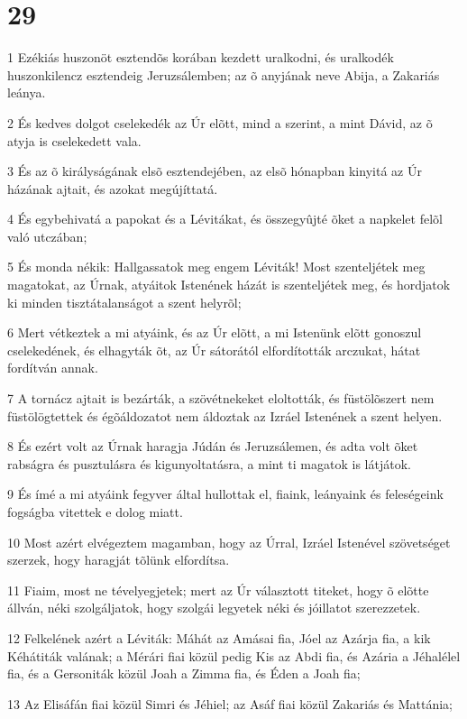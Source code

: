 \chapter{29}

\par 1 Ezékiás huszonöt esztendõs korában kezdett uralkodni, és uralkodék huszonkilencz esztendeig Jeruzsálemben; az õ anyjának neve Abija, a Zakariás leánya.
\par 2 És kedves dolgot cselekedék az Úr elõtt, mind a szerint, a mint Dávid, az õ atyja is cselekedett vala.
\par 3 És az õ királyságának elsõ esztendejében, az elsõ hónapban kinyitá az Úr házának ajtait, és azokat megújíttatá.
\par 4 És egybehivatá a papokat és a Lévitákat, és összegyûjté õket a napkelet felõl való utczában;
\par 5 És monda nékik: Hallgassatok meg engem Léviták! Most szenteljétek meg magatokat, az Úrnak, atyáitok Istenének házát is szenteljétek meg, és hordjatok ki minden tisztátalanságot a szent helyrõl;
\par 6 Mert vétkeztek a mi atyáink, és az Úr elõtt, a mi Istenünk elõtt gonoszul cselekedének, és elhagyták õt, az Úr sátorától elfordították arczukat, hátat fordítván annak.
\par 7 A tornácz ajtait is bezárták, a szövétnekeket eloltották, és füstölõszert nem füstölögtettek és égõáldozatot nem áldoztak az Izráel Istenének a szent helyen.
\par 8 És ezért volt az Úrnak haragja Júdán és Jeruzsálemen, és adta volt õket rabságra és pusztulásra és kigunyoltatásra, a mint ti magatok is látjátok.
\par 9 És ímé a mi atyáink fegyver által hullottak el, fiaink, leányaink és feleségeink fogságba vitettek e dolog miatt.
\par 10 Most azért elvégeztem magamban, hogy az Úrral, Izráel Istenével szövetséget szerzek, hogy haragját tõlünk elfordítsa.
\par 11 Fiaim, most ne tévelyegjetek; mert az Úr választott titeket, hogy õ elõtte állván, néki szolgáljatok, hogy szolgái legyetek néki és jóillatot szerezzetek.
\par 12 Felkelének azért a Léviták: Máhát az Amásai fia, Jóel az Azárja fia, a kik Kéhátiták valának; a Mérári fiai közül pedig Kis az Abdi fia, és Azária a Jéhalélel fia, és a Gersoniták közül Joah a Zimma fia, és Éden a Joah fia;
\par 13 Az Elisáfán fiai közül Simri és Jéhiel; az Asáf fiai közül Zakariás és Mattánia;
